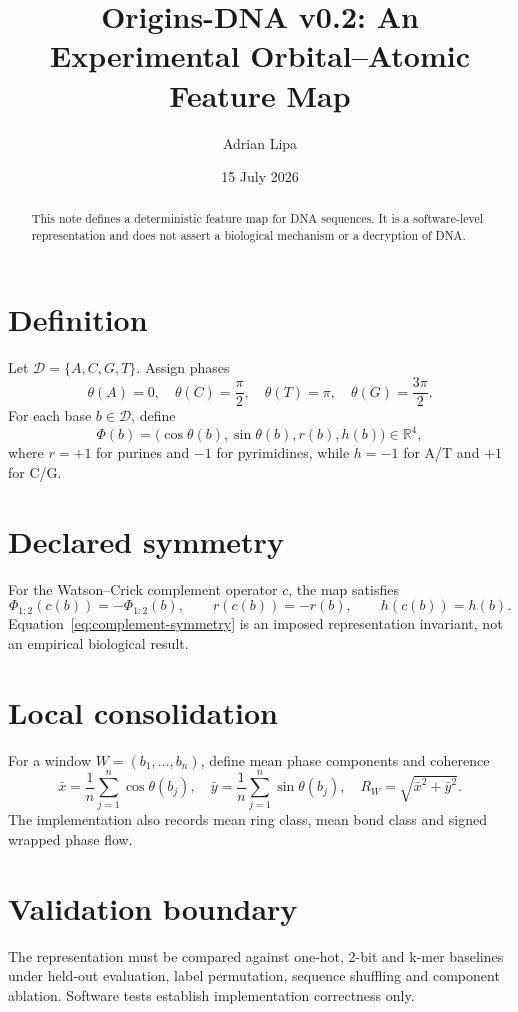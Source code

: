 \documentclass[11pt]{article}
\title{Origins-DNA v0.2: An Experimental Orbital--Atomic Feature Map}
\author{Adrian Lipa}
\date{15 July 2026}
\newcommand{\DNA}{\mathcal{D}}
\newcommand{\R}{\mathbb{R}}
\begin{document}
\maketitle

\begin{abstract}
This note defines a deterministic feature map for DNA sequences. It is a software-level representation and does not assert a biological mechanism or a decryption of DNA.
\end{abstract}

\section{Definition}
Let \(\DNA=\{A,C,G,T\}\). Assign phases
\begin{equation}
\theta(A)=0,\quad \theta(C)=\frac{\pi}{2},\quad
\theta(T)=\pi,\quad \theta(G)=\frac{3\pi}{2}.
\label{eq:phase-map}
\end{equation}
For each base \(b\in\DNA\), define
\begin{equation}
\Phi(b)=\bigl(\cos\theta(b),\sin\theta(b),r(b),h(b)\bigr)\in\R^4,
\label{eq:feature-map}
\end{equation}
where \(r=+1\) for purines and \(-1\) for pyrimidines, while \(h=-1\) for A/T and \(+1\) for C/G.

\section{Declared symmetry}
For the Watson--Crick complement operator \(c\), the map satisfies
\begin{equation}
\Phi_{1:2}(c(b))=-\Phi_{1:2}(b),\qquad
r(c(b))=-r(b),\qquad h(c(b))=h(b).
\label{eq:complement-symmetry}
\end{equation}
Equation~\eqref{eq:complement-symmetry} is an imposed representation invariant, not an empirical biological result.

\section{Local consolidation}
For a window \(W=(b_1,\ldots,b_n)\), define mean phase components and coherence
\begin{equation}
\bar{x}=\frac{1}{n}\sum_{j=1}^n\cos\theta(b_j),\quad
\bar{y}=\frac{1}{n}\sum_{j=1}^n\sin\theta(b_j),\quad
R_W=\sqrt{\bar{x}^2+\bar{y}^2}.
\label{eq:coherence}
\end{equation}
The implementation also records mean ring class, mean bond class and signed wrapped phase flow.

\section{Validation boundary}
The representation must be compared against one-hot, 2-bit and k-mer baselines under held-out evaluation, label permutation, sequence shuffling and component ablation. Software tests establish implementation correctness only.
\end{document}
